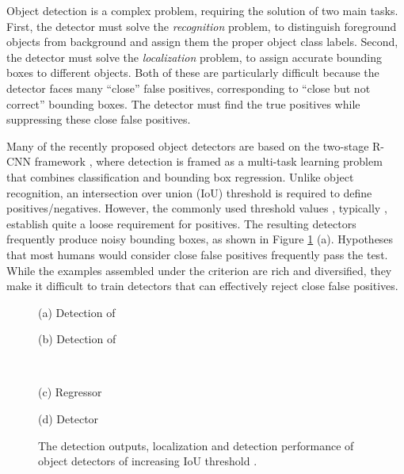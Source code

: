\documentclass[10pt,twocolumn,letterpaper]{article}
\begin{document}
Object detection is a complex problem, requiring the solution of two main tasks. First, the detector must solve the {\it recognition\/} problem, to distinguish foreground objects from background and assign them the proper object class labels. Second, the detector must solve the {\it localization\/} problem, to assign accurate bounding boxes to different objects. Both of these are particularly difficult because the detector faces many ``close'' false positives, corresponding to ``close but not correct'' bounding boxes. The detector must find the true positives while suppressing these close false positives.

Many of the recently proposed object detectors are based on the
two-stage R-CNN framework \cite{DBLP:conf/cvpr/GirshickDDM14,DBLP:conf/iccv/Girshick15,DBLP:conf/nips/RenHGS15,lin2017feature}, where detection is framed
as a multi-task learning problem that combines classification and bounding
box regression. Unlike object recognition, an intersection over union (IoU)
threshold is required to define positives/negatives. However, the commonly used threshold values , typically , establish quite a loose
requirement for positives. The resulting detectors frequently produce noisy
bounding boxes, as shown in Figure \ref{fig:motivation} (a). Hypotheses
that most humans would consider close false positives frequently pass the  test. While the examples assembled under the  criterion are
rich and diversified, they make it difficult to train detectors that can
effectively reject close false positives.


\begin{figure}[!t]
\begin{minipage}[b]{.495\linewidth}
\centering
\centerline{}{(a) Detection of }
\end{minipage}
\hfill
\begin{minipage}[b]{.495\linewidth}
\centering
\centerline{}{(b) Detection of }
\end{minipage}\\
\hfill
\begin{minipage}[b]{.48\linewidth}
\centering
\centerline{}{(c) Regressor}
\end{minipage}
\hfill
\begin{minipage}[b]{.48\linewidth}
\centering
\centerline{}{(d) Detector}
\end{minipage}
\caption{The detection outputs, localization and detection performance of object detectors of increasing IoU threshold .}
\label{fig:motivation}
\end{figure}
\end{document}
